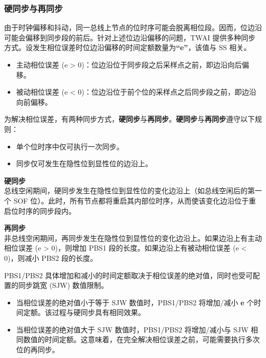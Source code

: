 \documentclass[main\_\_CN.tex]{subfiles}
\begin{document}


\subsubsection{硬同步与再同步}


由于时钟偏移和抖动，同一总线上节点的位时序可能会脱离相位段。因而，位边沿可能会偏移到同步段的前后。针对上述位边沿偏移的问题，TWAI 提供多种同步方式。设发生相位误差时位边沿偏移的时间定额数量为\textbf{“e”}，该值与 SS 相关。

\begin{itemize}
    \item 主动相位误差 (e > 0)：位边沿位于同步段之后采样点之前，即边沿向后偏移。
    \item 被动相位误差 (e < 0)：位边沿位于前个位的采样点之后同步段之前，即边沿向前偏移。
\end{itemize}

为解决相位误差，有两种同步方式，\textbf{硬同步}与\textbf{再同步}。\textbf{硬同步}与\textbf{再同步}遵守以下规则：

\begin{itemize}
    \item 单个位时序中仅可执行一次同步。
    \item 同步仅可发生在隐性位到显性位的边沿上。
\end{itemize}

{\bfseries 硬同步}\\
总线空闲期间，硬同步发生在隐性位到显性位的变化边沿上（如总线空闲后的第一个 SOF 位）。此时，所有节点都将重启其内部位时序，从而使该变化边沿位于重启位时序的同步段内。

{\bfseries 再同步}\\
非总线空闲期间，再同步发生在隐性位到显性位的变化边沿上。如果边沿上有主动相位误差 (e > 0)，则增加 PBS1 段的长度。如果边沿上有被动相位误差 (e < 0)，则减小 PBS2 段的长度。

PBS1/PBS2 具体增加和减小的时间定额取决于相位误差的绝对值，同时也受可配置的同步跳宽 (SJW) 数值限制。

\begin{itemize}
    \item 当相位误差的绝对值小于等于 SJW 数值时，PBS1/PBS2 将增加/减小 \textbf{e} 个时间定额。该过程与硬同步具有相同效果。
    \item 当相位误差的绝对值大于 SJW 数值时，PBS1/PBS2 将增加/减小与 SJW 相同数值的时间定额。这意味着，在完全解决相位误差之前，可能需要执行多次位的再同步。
\end{itemize}
\end{document}
